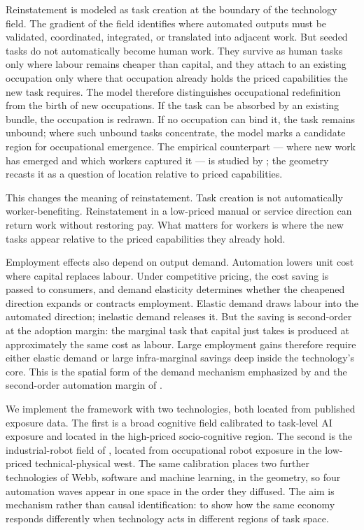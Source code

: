 \documentclass[12pt, a4paper]{article}
\begin{document}
Reinstatement is modeled as task creation at the boundary of the
technology field. The gradient of the field identifies where automated
outputs must be validated, coordinated, integrated, or translated into
adjacent work. But seeded tasks do not automatically become human work.
They survive as human tasks only where labour remains cheaper than
capital, and they attach to an existing occupation only where that
occupation already holds the priced capabilities the new task requires.
The model therefore distinguishes occupational redefinition from the
birth of new occupations. If the task can be absorbed by an existing
bundle, the occupation is redrawn. If no occupation can bind it, the task
remains unbound; where such unbound tasks concentrate, the model marks a
candidate region for occupational emergence. The empirical counterpart
--- where new work has emerged and which workers captured it --- is
studied by \textcite{autor2024newwork}; the geometry recasts it as a
question of location relative to priced capabilities.

This changes the meaning of reinstatement. Task creation is not
automatically worker-benefiting. Reinstatement in a low-priced manual
or service direction can return work without restoring pay. What
matters for workers is where the new tasks appear relative to the
priced capabilities they already hold.

Employment effects also depend on output demand. Automation lowers unit
cost where capital replaces labour. Under competitive pricing, the cost
saving is passed to consumers, and demand elasticity determines whether
the cheapened direction expands or contracts employment. Elastic demand
draws labour into the automated direction; inelastic demand releases it.
But the saving is second-order at the adoption margin: the marginal task
that capital just takes is produced at approximately the same cost as
labour. Large employment gains therefore require either elastic demand
or large infra-marginal savings deep inside the technology's core. This
is the spatial form of the demand mechanism emphasized by
\textcite{bessen2019demand} and the second-order automation margin of
\textcite{acemoglu2018race}.

We implement the framework with two technologies, both located from
published exposure data. The first is a broad cognitive field calibrated
to task-level AI exposure and located in the high-priced socio-cognitive
region. The second is the industrial-robot field of \textcite{webb2020},
located from occupational robot exposure in the low-priced technical-physical
west. The same calibration places two further technologies of Webb,
software and machine learning, in the geometry, so four automation waves
appear in one space in the order they diffused. The aim is mechanism
rather than causal identification: to show how the same economy responds
differently when technology acts in different regions of task space.
\end{document}
